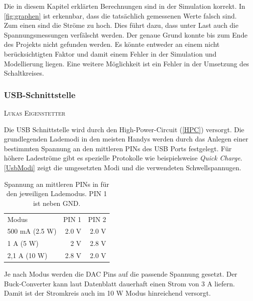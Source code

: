 \documentclass[12pt,a4paper,bibliography=totocnumbered,listof=totocnumbered]{article}
\makeatletter
\newcommand{\chapterauthor}[1]{%
  {\parindent0pt\vspace*{-5pt}%
  \linespread{1.1}\small\scshape#1%
  \par\nobreak\vspace*{3pt}}
  \@afterheading%
}
\makeatother
\begin{document}
Die in diesem Kapitel erklärten Berechnungen sind in der Simulation korrekt.
In \autoref{fig:graphen} ist erkennbar, dass die tatsächlich gemessenen Werte falsch sind.
Zum einen sind die Ströme zu hoch.
Dies führt dazu, dass unter Last auch die Spannungsmessungen verfälscht werden.
Der genaue Grund konnte bis zum Ende des Projekts nicht gefunden werden.
Es könnte entweder an einem nicht berücksichtigten Faktor und damit einem Fehler in der Simulation und Modellierung liegen.
Eine weitere Möglichkeit ist ein Fehler in der Umsetzung des Schaltkreises.

\subsubsection{USB-Schnittstelle}\label{usbSchnittstelle}
\chapterauthor{Lukas Eigenstetter}
Die USB Schnittstelle wird durch den High-Power-Circuit (\autoref{HPC}) versorgt.
Die grundlegenden Lademodi in den meisten Handys werden durch das Anlegen einer bestimmten Spannung an den mittleren PINs des USB Ports festgelegt.
Für höhere Ladeströme gibt es spezielle Protokolle wie beispielsweise \emph{Quick Charge}. \autocite{quickCharge}
\autoref{UsbModi} zeigt die umgesetzten Modi und die verwendeten Schwellspannugen.

\begin{table}[H]
    \begin{center}
        \begin{tabular}{|l|r|r|}
            \hline
            Modus          & PIN 1 & PIN 2 \\
            \Xhline{3\arrayrulewidth}
            500 mA (2.5 W) & 2.0 V & 2.0 V \\
            \hline
            1 A (5 W)      & 2 V   & 2.8 V \\
            \hline
            2,1 A (10 W)   & 2.8 V & 2.0 V \\
            \hline
        \end{tabular}
        \caption{Spannung an mittleren PINs in für den jeweiligen Lademodus. PIN 1 ist neben GND. \autocite{usbProtokoll}}
        \label{UsbModi}
    \end{center}
\end{table}

Je nach Modus werden die DAC Pins auf die passende Spannung gesetzt.
Der Buck-Converter kann laut Datenblatt dauerhaft einen Strom von 3 A liefern.
Damit ist der Stromkreis auch im 10 W Modus hinreichend versorgt.
\end{document}
